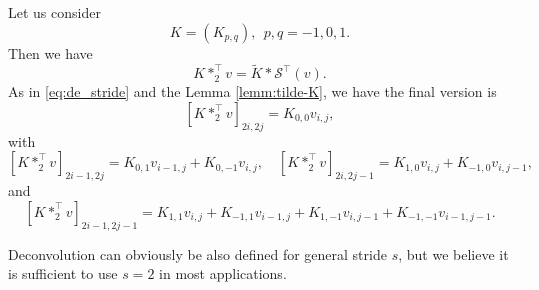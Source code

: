 \begin{theorem}\label{thm:deconv_op}
	
	Let us consider 
	\begin{equation}
	K=(K_{p,q}),~~p,q = -1, 0, 1.
	\end{equation}
	Then we have 
	$$
	K \ast_2^\top v = \tilde K \ast \mathcal S^\top (v).
	$$
	As in \eqref{eq:de_stride} and the Lemma \ref{lemm:tilde-K}, we have the 
	final version is 
	\begin{equation}
	\label{eq:7}
	[K \ast_2^\top v ]_{2i,2j}=  K_{0,0}v_{i,j},
	\end{equation}
	with 
	\begin{equation}
	\label{eq:9}
	[K \ast_2^\top v ]_{2i-1, 2j} = K_{0,1}v_{i-1,j} + K_{0,-1}v_{i,j}, \quad 
	[K \ast_2^\top v ]_{2i, 2j-1} = K_{1,0}v_{i,j} + K_{-1,0}v_{i,j-1},
	\end{equation}
	and
	\begin{equation}
	[K \ast_2^\top v ]_{2i-1, 2j-1}  =  
	K_{1,1}v_{i,j} + K_{-1,1}v_{i-1,j} + K_{1,-1}v_{i,j-1} + K_{-1,-1}v_{i-1,j-1}.
	\end{equation}
\end{theorem}
\begin{remark}
	Deconvolution can obviously be also defined for general stride $s$, but we believe it is sufficient to use $s=2$
	in most applications. 
\end{remark}

